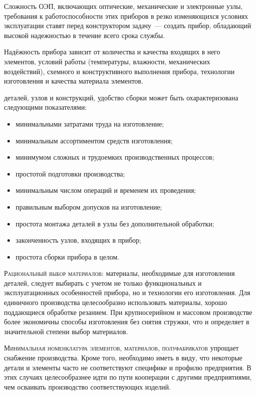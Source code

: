 \documentclass{tufte-book}
\begin{document}
Сложность ОЭП, включающих оптические, механические и электронные узлы, требования к работоспособности этих приборов в резко изменяющихся условиях эксплуатации ставят перед конструктором задачу~--- создать прибор, обладающий высокой надежностью в течение всего срока службы.

Надёжность прибора зависит от количества и качества входящих в него элементов, условий работы (температуры, влажности, механических воздействий), схемного и конструктивного выполнения прибора, технологии изготовления и качества материала элементов.

 деталей, узлов и конструкций, удобство сборки может быть охарактеризована следующими показателями: 
\begin{itemize}
	\item минимальными затратами труда на изготовление;
	\item минимальным ассортиментом средств изготовления;
	\item минимумом сложных и трудоемких производственных процессов;
	\item простотой подготовки производства;
	\item минимальным числом операций и временем их проведения;
	\item правильным выбором допусков на изготовление;
	\item простота монтажа деталей в узлы без дополнительной обработки;
	\item законченность узлов, входящих в прибор;
	\item простота сборки прибора в целом.
\end{itemize}

\textsc{Рациональный выбор материалов}: материалы, необходимые для изготовления деталей, следует выбирать с учетом не только функциональных и эксплуатационных особенностей прибора, но и технологии его изготовления. Для единичного производства целесообразно использовать материалы, хорошо поддающиеся обработке резанием. При крупносерийном и массовом производстве более экономичны способы изготовления без снятия стружки, что и определяет в значительной степени выбор материалов.

\textsc{Минимальная номенклатура элементов, материалов, полуфабрикатов} упрощает снабжение производства. 
Кроме того, необходимо иметь в виду, что некоторые детали и элементы часто не соответствуют специфике и профилю предприятия. В этих случаях целесообразнее идти по пути кооперации с другими предприятиями, чем осваивать производство соответствующих изделий.
\end{document}
